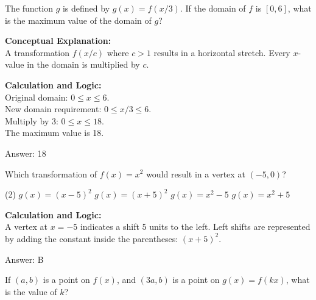 \documentclass[11pt,paper=a4,answers]{exam}
\begin{document}
\begin{questions}
\question
The function $g$ is defined by $g(x) = f(x/3)$. If the domain of $f$ is $[0, 6]$, what is the maximum value of the domain of $g$?

\begin{solution}
\textbf{Conceptual Explanation:} \\
A transformation $f(x/c)$ where $c > 1$ results in a horizontal stretch. Every $x$-value in the domain is multiplied by $c$.

\vspace{20pt}

\textbf{Calculation and Logic:} \\
Original domain: $0 \leq x \leq 6$. \\
New domain requirement: $0 \leq x/3 \leq 6$. \\
Multiply by 3: $0 \leq x \leq 18$. \\
The maximum value is 18.

\vspace{25pt}

Answer: \colorbox{yellow!100}{18}
\end{solution}

\vspace{40pt}

\question
Which transformation of $f(x) = x^2$ would result in a vertex at $(-5, 0)$?
\begin{tasks}(2)
    \task $g(x) = (x-5)^2$
    \task $g(x) = (x+5)^2$
    \task $g(x) = x^2 - 5$
    \task $g(x) = x^2 + 5$
\end{tasks}

\begin{solution}
\textbf{Calculation and Logic:} \\
A vertex at $x = -5$ indicates a shift 5 units to the left. Left shifts are represented by adding the constant inside the parentheses: $(x+5)^2$.

\vspace{25pt}

Answer: \colorbox{yellow!100}{B}
\end{solution}

\vspace{40pt}

\question
If $(a, b)$ is a point on $f(x)$, and $(3a, b)$ is a point on $g(x) = f(kx)$, what is the value of $k$?


\end{questions}
\end{document}
